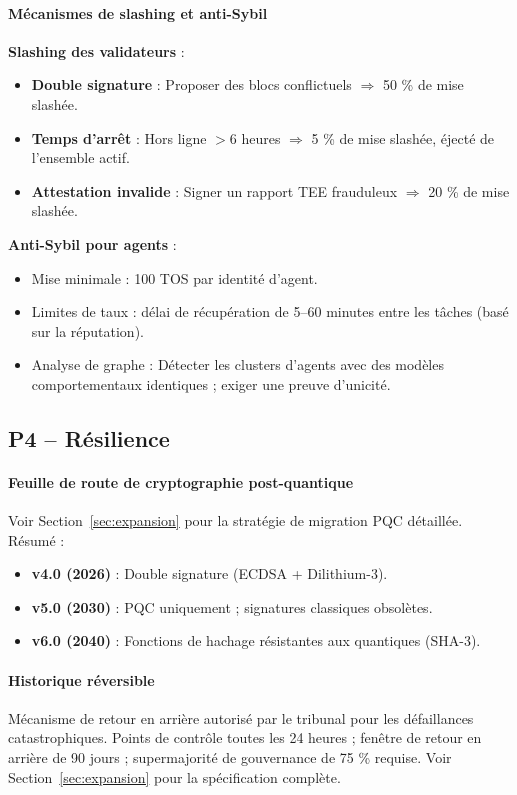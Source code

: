 \documentclass[11pt]{article}
\begin{document}
\paragraph{Mécanismes de slashing et anti-Sybil}
\textbf{Slashing des validateurs} :
\begin{itemize}[noitemsep]
  \item \textbf{Double signature} : Proposer des blocs conflictuels $\Rightarrow$ 50 \% de mise slashée.
  \item \textbf{Temps d'arrêt} : Hors ligne $>$6 heures $\Rightarrow$ 5 \% de mise slashée, éjecté de l'ensemble actif.
  \item \textbf{Attestation invalide} : Signer un rapport TEE frauduleux $\Rightarrow$ 20 \% de mise slashée.
\end{itemize}

\textbf{Anti-Sybil pour agents} :
\begin{itemize}[noitemsep]
  \item Mise minimale : 100 TOS par identité d'agent.
  \item Limites de taux : délai de récupération de 5--60 minutes entre les tâches (basé sur la réputation).
  \item Analyse de graphe : Détecter les clusters d'agents avec des modèles comportementaux identiques ; exiger une preuve d'unicité.
\end{itemize}

\subsection{P4 -- Résilience}
\label{sec:pillar-resilience}

\paragraph{Feuille de route de cryptographie post-quantique}
Voir Section~\ref{sec:expansion} pour la stratégie de migration PQC détaillée. Résumé :
\begin{itemize}[noitemsep]
  \item \textbf{v4.0 (2026)} : Double signature (ECDSA + Dilithium-3).
  \item \textbf{v5.0 (2030)} : PQC uniquement ; signatures classiques obsolètes.
  \item \textbf{v6.0 (2040)} : Fonctions de hachage résistantes aux quantiques (SHA-3).
\end{itemize}

\paragraph{Historique réversible}
Mécanisme de retour en arrière autorisé par le tribunal pour les défaillances catastrophiques. Points de contrôle toutes les 24 heures ; fenêtre de retour en arrière de 90 jours ; supermajorité de gouvernance de 75 \% requise. Voir Section~\ref{sec:expansion} pour la spécification complète.
\end{document}
